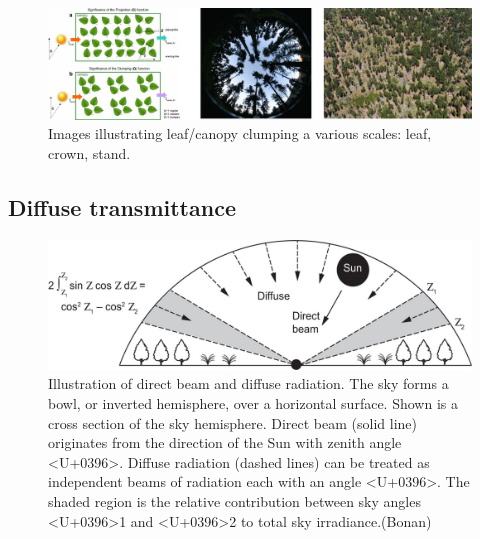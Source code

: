 \documentclass[
  oneside]{book}
\begin{document}
\begin{figure}

{\centering \includegraphics[width=0.8\linewidth]{figures/chap3/f315_clumping} 

}

\caption{Images illustrating leaf/canopy clumping a various scales: leaf, crown, stand.}\label{fig:f315}
\end{figure}

\hypertarget{diffuse-transmittance}{%
\subsection{Diffuse transmittance}\label{diffuse-transmittance}}

\begin{figure}

{\centering \includegraphics[width=0.8\linewidth]{figures/chap3/f316_diffuse} 

}

\caption{Illustration of direct beam and diffuse radiation. The sky forms a bowl, or inverted hemisphere, over a horizontal surface. Shown is a cross section of the sky hemisphere. Direct beam (solid line) originates from the    direction of the Sun with zenith angle <U+0396>. Diffuse radiation (dashed lines) can be treated as independent beams of radiation each with an angle <U+0396>. The shaded region is the relative contribution between sky angles <U+0396>1 and <U+0396>2 to total sky irradiance.(Bonan)}\label{fig:f316}
\end{figure}
\end{document}
